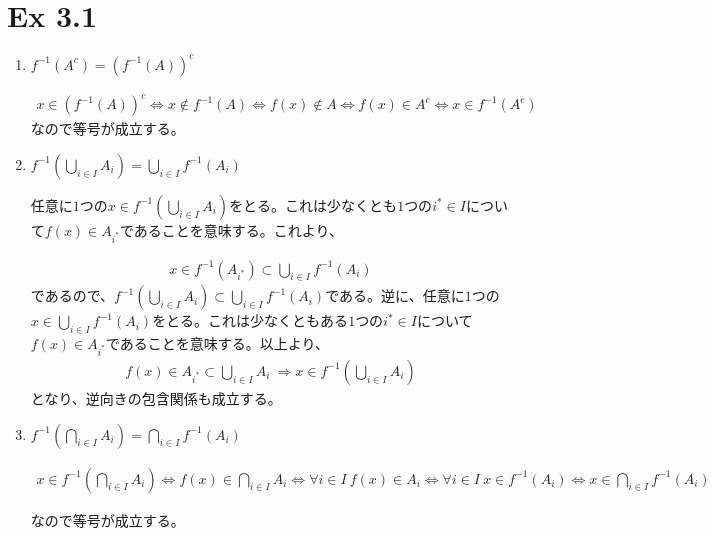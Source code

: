 \documentclass{article}
\begin{document}
\section{Ex 3.1}
\begin{enumerate}
	\item $f^{-1}\left( A^c \right) = \left( f^{-1}\left( A \right) \right)^c$
	
	\begin{align*}
		x \in \left( f^{-1}\left( A \right) \right)^c \Leftrightarrow x \not\in f^{-1}\left( A \right) \Leftrightarrow f(x) \not\in A \Leftrightarrow f(x) \in A^c \Leftrightarrow x \in f^{-1}\left( A^c \right)
	\end{align*}
	なので等号が成立する。
	\item $f^{-1}\left( \bigcup_{i\in I} A_i \right) = \bigcup_{i\in I} f^{-1} \left( A_i \right)$
	
	任意に$1$つの$x \in f^{-1}\left( \bigcup_{i\in I} A_i \right)$をとる。これは少なくとも$1$つの$i^* \in I$について$f(x) \in A_{i^*}$であることを意味する。これより、
	
	\begin{align*}
		x \in f^{-1}\left( A_{i^*}\right) \subset \bigcup_{i \in I} f^{-1}\left( A_i \right)
	\end{align*}
	であるので、$f^{-1}\left( \bigcup_{i\in I} A_i \right) \subset \bigcup_{i\in I} f^{-1} \left( A_i \right)$である。逆に、任意に$1$つの$x \in \bigcup_{i\in I} f^{-1} \left( A_i \right)$をとる。これは少なくともある$1$つの$i^* \in I$について$f(x) \in A_{i^*}$であることを意味する。以上より、
	\begin{align*}
		f(x) \in A_{i^*} \subset \bigcup_{i\in I} A_i\ \Rightarrow x \in f^{-1}\left( \bigcup_{i \in I} A_i \right)
	\end{align*}
	となり、逆向きの包含関係も成立する。
	
	\item $f^{-1}\left( \bigcap_{i \in I} A_i \right) = \bigcap_{i \in I} f^{-1}\left( A_i \right)$
	
	\begin{align*}
		x \in f^{-1}\left( \bigcap_{i \in I} A_i \right) \Leftrightarrow f(x) \in \bigcap_{i \in I} A_i \Leftrightarrow \forall i \in I\  f(x) \in A_i \Leftrightarrow \forall i \in I\ x \in f^{-1}\left( A_i \right) \Leftrightarrow x \in \bigcap_{i \in I} f^{-1}\left( A_i \right)
	\end{align*}
	
	なので等号が成立する。
\end{enumerate}
\end{document}
